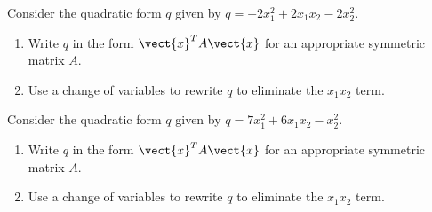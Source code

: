 \begin{enumialphparenastyle}
\begin{ex} Consider the quadratic form $q$ given by $q = -2x_1^2 + 2x_1x_2 - 2x_2^2$.
\begin{enumerate}
\item Write $q$ in the form $\vect{x}^TA\vect{x}$ for an appropriate symmetric matrix $A$.
\item Use a change of variables to rewrite $q$ to eliminate the $x_1x_2$ term. 
\end{enumerate}
\end{ex}

\begin{ex} Consider the quadratic form $q$ given by $q = 7x_1^2 + 6x_1x_2 - x_2^2$.
\begin{enumerate}
\item Write $q$ in the form $\vect{x}^TA\vect{x}$ for an appropriate symmetric matrix $A$.
\item Use a change of variables to rewrite $q$ to eliminate the $x_1x_2$ term. 
\end{enumerate}
\end{ex}

\end{enumialphparenastyle}